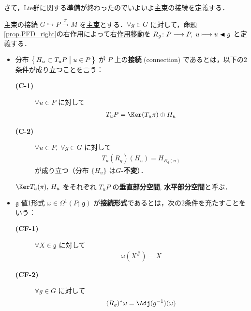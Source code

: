\documentclass[TQFT_main]{subfiles}
\begin{document}
さて，Lie群に関する準備が終わったのでいよいよ\hyperref[def.PFD]{主束}の接続を定義する．
\begin{mydef}[label=def:connection]{主束の接続}
    $G \hookrightarrow P \xrightarrow{\pi} M$ を\hyperref[def.PFD]{主束}とする．$\forall g \in G$ に対して，命題\ref{prop.PFD_right}の右作用によって\hyperref[def:fundamental-vecf]{右作用移動}を $R_g \colon P \longrightarrow P,\; u \longmapsto u \blacktriangleleft g$ と定義する．
    \begin{itemize}
        \item 分布 $\bigl\{\, H_u \subset T_u P \bigm| u \in P \,\bigr\}$ が $P$ 上の\textbf{接続} (connection) であるとは，以下の2条件が成り立つことを言う：
        \begin{description}
            \item[\textbf{(C-1)}]  $\forall u \in P$ に対して
            \begin{align}
                T_u P = \Ker (T_u \pi) \oplus H_u
            \end{align}
            \item[\textbf{(C-2)}] $\forall u \in P,\; \forall g \in G$ に対して
            \begin{align}
                T_u(R_g) (H_u) = H_{R_g(u)}
            \end{align}
            が成り立つ（分布 $\{H_u\}$ は\textbf{$G$-不変}）．
        \end{description}
        $\Ker T_u (\pi),\, H_u$ をそれぞれ $T_u P$ の\textbf{垂直部分空間}, \textbf{水平部分空間}と呼ぶ．
        \item $\mathfrak{g}$ 値1形式 $\omega \in \Omega^1(P;\, \mathfrak{g})$ が\textbf{接続形式}であるとは，次の2条件を充たすことをいう：
        \begin{description}
            \item[\textbf{(CF-1)}] $\forall X \in \mathfrak{g}$ に対して
            \begin{align}
                \omega(X^\#) = X
            \end{align}
            \item[\textbf{(CF-2)}] $\forall g \in G$ に対して
            \begin{align}
                (R_g)^* \omega = \Adj (g^{-1})(\omega)
            \end{align}
        \end{description}
    \end{itemize}
    
\end{mydef}
\end{document}
